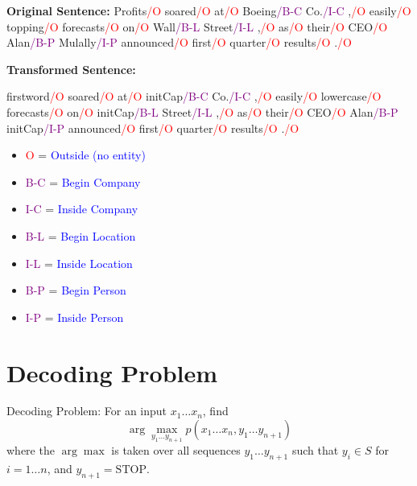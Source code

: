   
\textbf{Original Sentence:}
Profits\textcolor{red}{/O} soared\textcolor{red}{/O} at\textcolor{red}{/O} Boeing\textcolor{purple}{/B-C} Co.\textcolor{purple}{/I-C} ,\textcolor{red}{/O} easily\textcolor{red}{/O} topping\textcolor{red}{/O} forecasts\textcolor{red}{/O} on\textcolor{red}{/O} Wall\textcolor{purple}{/B-L} Street\textcolor{purple}{/I-L} ,\textcolor{red}{/O} as\textcolor{red}{/O} their\textcolor{red}{/O} CEO\textcolor{red}{/O} Alan\textcolor{purple}{/B-P} Mulally\textcolor{purple}{/I-P} announced\textcolor{red}{/O} first\textcolor{red}{/O} quarter\textcolor{red}{/O} results\textcolor{red}{/O} .\textcolor{red}{/O} \vspace{0.5cm}


\textbf{Transformed Sentence:}

firstword\textcolor{red}{/O} soared\textcolor{red}{/O} at\textcolor{red}{/O} initCap\textcolor{purple}{/B-C} Co.\textcolor{purple}{/I-C} ,\textcolor{red}{/O} easily\textcolor{red}{/O} lowercase\textcolor{red}{/O} forecasts\textcolor{red}{/O} on\textcolor{red}{/O} initCap\textcolor{purple}{/B-L} Street\textcolor{purple}{/I-L} ,\textcolor{red}{/O} as\textcolor{red}{/O} their\textcolor{red}{/O} CEO\textcolor{red}{/O} Alan\textcolor{purple}{/B-P} initCap\textcolor{purple}{/I-P} announced\textcolor{red}{/O} first\textcolor{red}{/O} quarter\textcolor{red}{/O} results\textcolor{red}{/O} .\textcolor{red}{/O} \vspace{0.5cm}


  \begin{itemize}
    \item \textcolor{red}{O} = \textcolor{blue}{Outside (no entity)}
    \item \textcolor{purple}{B-C} = \textcolor{blue}{Begin Company}
    \item \textcolor{purple}{I-C} = \textcolor{blue}{Inside Company}
    \item \textcolor{purple}{B-L} = \textcolor{blue}{Begin Location}
    \item \textcolor{purple}{I-L} = \textcolor{blue}{Inside Location}
    \item \textcolor{purple}{B-P} = \textcolor{blue}{Begin Person}
    \item \textcolor{purple}{I-P} = \textcolor{blue}{Inside Person}
  \end{itemize}


\section{Decoding Problem}
  Decoding Problem: For an input $x_1 \ldots x_n$, find
  \[
    \arg \max_{y_1 \ldots y_{n+1}} p(x_1 \ldots x_n, y_1 \ldots y_{n+1})
  \]
  where the $\arg \max$ is taken over all sequences $y_1 \ldots y_{n+1}$ such that $y_i \in S$ for $i = 1 \ldots n$, and $y_{n+1} = \text{STOP}$.

